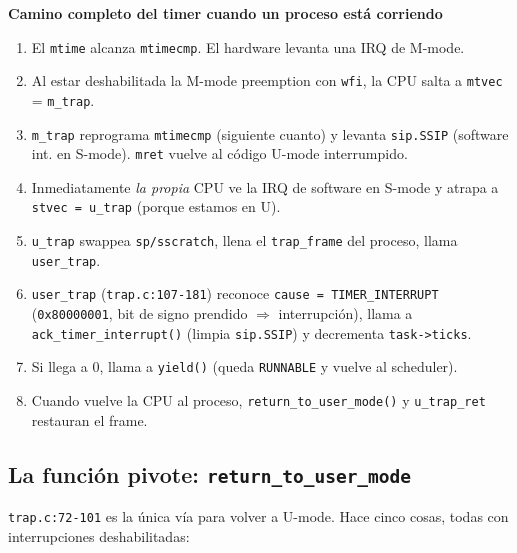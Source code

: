 \documentclass[11pt,a4paper]{article}
\begin{document}
\begin{walkthrough}
\textbf{Camino completo del timer cuando un proceso está corriendo}

\begin{enumerate}[leftmargin=*]
    \item El \texttt{mtime} alcanza \texttt{mtimecmp}. El hardware
        levanta una IRQ de M-mode.
    \item Al estar deshabilitada la M-mode preemption con \texttt{wfi},
        la CPU salta a \texttt{mtvec} = \texttt{m\_trap}.
    \item \texttt{m\_trap} reprograma \texttt{mtimecmp} (siguiente
        cuanto) y levanta \texttt{sip.SSIP} (software int. en
        S-mode). \texttt{mret} vuelve al código U-mode interrumpido.
    \item Inmediatamente \emph{la propia} CPU ve la IRQ de software
        en S-mode y atrapa a \texttt{stvec = u\_trap} (porque
        estamos en U).
    \item \texttt{u\_trap} swappea \texttt{sp/sscratch}, llena el
        \texttt{trap\_frame} del proceso, llama \texttt{user\_trap}.
    \item \texttt{user\_trap} (\texttt{trap.c:107-181}) reconoce
        \texttt{cause = TIMER\_INTERRUPT} (\texttt{0x80000001},
        bit de signo prendido $\Rightarrow$ interrupción), llama a
        \texttt{ack\_timer\_interrupt()} (limpia \texttt{sip.SSIP})
        y decrementa \texttt{task->ticks}.
    \item Si llega a 0, llama a \texttt{yield()} (queda
        \texttt{RUNNABLE} y vuelve al scheduler).
    \item Cuando vuelve la CPU al proceso, \texttt{return\_to\_user\_mode()}
        y \texttt{u\_trap\_ret} restauran el frame.
\end{enumerate}
\end{walkthrough}

\subsection*{La función pivote: \texttt{return\_to\_user\_mode}}

\texttt{trap.c:72-101} es la única vía para volver a U-mode. Hace
cinco cosas, todas con interrupciones deshabilitadas:
\end{document}
